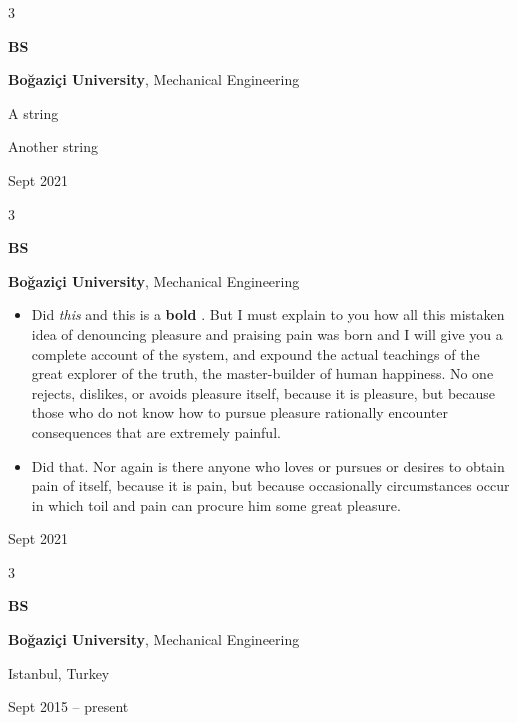 \documentclass[10pt, letterpaper]{article}
\newenvironment{summary}{
    \begin{description}[
        topsep=0.10 cm,
        parsep=0.10 cm,
        partopsep=0pt,
        itemsep=0pt,
        leftmargin=0.4 cm + 10pt
    ]
}{
    \end{description}
} %
\newenvironment{highlights}{
    \begin{itemize}[
        topsep=0.10 cm,
        parsep=0.10 cm,
        partopsep=0pt,
        itemsep=0pt,
        leftmargin=0.4 cm + 10pt
    ]
}{
    \end{itemize}
} %
\newenvironment{threecolentry}[3][]{
    \onecolentry
    \def\thirdColumn{#3}
    \setcolumnwidth{1 cm, \fill, 4.5 cm}
    \begin{paracol}{3}
    {\raggedright #2} \switchcolumn
}{
    \switchcolumn \raggedleft \thirdColumn
    \end{paracol}
    \endonecolentry
} %
\let\hrefWithoutArrow\href
\renewcommand{\href}[2]{\hrefWithoutArrow{#1}{\ifthenelse{\equal{#2}{}}{ }{#2 }\raisebox{.15ex}{\footnotesize \faExternalLink*}}}
\begin{document}
        \vspace{0.2 cm}

        \begin{threecolentry}{\textbf{BS}}{
            Sept 2021
        }
            \textbf{Boğaziçi University}, Mechanical Engineering
            \begin{summary}
                \item A string
                \item Another string
            \end{summary}
        \end{threecolentry}

        \vspace{0.2 cm}

        \begin{threecolentry}{\textbf{BS}}{
            Sept 2021
        }
            \textbf{Boğaziçi University}, Mechanical Engineering
            \begin{highlights}
                \item Did \textit{this} and this is a \textbf{bold} \href{https://example.com}{link}. But I must explain to you how all this mistaken idea of denouncing pleasure and praising pain was born and I will give you a complete account of the system, and expound the actual teachings of the great explorer of the truth, the master-builder of human happiness. No one rejects, dislikes, or avoids pleasure itself, because it is pleasure, but because those who do not know how to pursue pleasure rationally encounter consequences that are extremely painful.
                \item Did that. Nor again is there anyone who loves or pursues or desires to obtain pain of itself, because it is pain, but because occasionally circumstances occur in which toil and pain can procure him some great pleasure.
            \end{highlights}
        \end{threecolentry}

        \vspace{0.2 cm}

        \begin{threecolentry}{\textbf{BS}}{
            Istanbul, Turkey

        Sept 2015 – present
        }
            \textbf{Boğaziçi University}, Mechanical Engineering
        \end{threecolentry}

        \vspace{0.2 cm}
\end{document}
